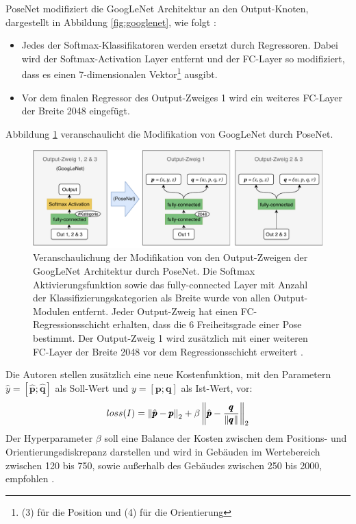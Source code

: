 PoseNet modifiziert die GoogLeNet Architektur an den Output-Knoten, dargestellt in Abbildung \ref{fig:googlenet}, wie folgt \cite{kendallPoseNetConvolutionalNetwork2015}:
\begin{itemize}
	\item Jedes der Softmax-Klassifikatoren werden ersetzt durch Regressoren. Dabei wird der Softmax-Activation Layer entfernt und der FC-Layer so modifiziert, dass es einen 7-dimensionalen Vektor\footnote{(3) für die Position und (4) für die Orientierung} ausgibt.
	\item Vor dem finalen Regressor des Output-Zweiges 1 wird ein weiteres FC-Layer der Breite 2048 eingefügt.

\end{itemize}
Abbildung \ref{fig:posenet_mods} veranschaulicht die Modifikation von GoogLeNet durch PoseNet.
\vspace*{1.2cm}
 \begin{figure}[H]
	\centering
	\includegraphics[width=\textwidth]{images/googlenet/posenet_diagram2.pdf}
	\caption{Veranschaulichung der Modifikation von den Output-Zweigen der GoogLeNet Architektur durch PoseNet. Die Softmax Aktivierungsfunktion sowie das fully-connected Layer mit Anzahl der Klassifizierungskategorien als Breite wurde von allen Output-Modulen entfernt. Jeder Output-Zweig hat einen FC-Regressionsschicht erhalten, dass die 6 Freiheitsgrade einer Pose bestimmt. Der Output-Zweig 1 wird zusätzlich mit einer weiteren FC-Layer der Breite 2048 vor dem Regressionsschicht erweitert \cite{kendallPoseNetConvolutionalNetwork2015}.}
	\label{fig:posenet_mods}
\end{figure}
\vspace*{1.5cm}

Die Autoren \citet{kendallPoseNetConvolutionalNetwork2015} stellen zusätzlich eine neue Kostenfunktion, mit den Parametern $\hat{y} = [\hat{\pmb{p}};\hat{\pmb{q}}]$ als Soll-Wert und $y = [\pmb{p};\pmb{q}]$ als Ist-Wert, vor:
\begin{equation}
	\label{eq:posenet_loss}
	loss(I) = \left\lVert \hat{\pmb{p}} - \pmb{p} \right\rVert_2 + \beta \left\lVert \hat{\pmb{p}} - \frac{\pmb{q}}{\left\lVert\pmb{q}\right\rVert}\right\rVert_2
\end{equation}
Der Hyperparameter $\beta$ soll eine Balance der Kosten zwischen dem Positions- und Orientierungsdiskrepanz darstellen und wird in Gebäuden im Wertebereich zwischen 120 bis 750, sowie außerhalb des Gebäudes zwischen 250 bis 2000, empfohlen \cite{kendallPoseNetConvolutionalNetwork2015}. 